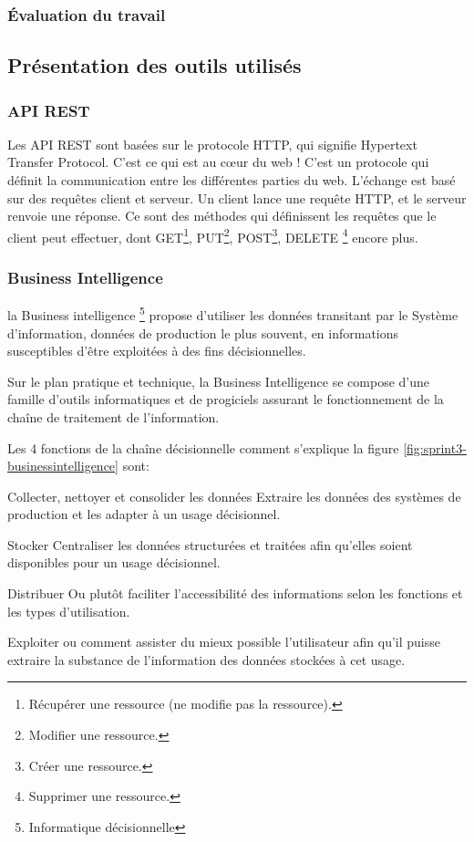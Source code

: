 \subsubsection{Évaluation du travail}
\subsection{Présentation des outils utilisés}
\subsubsection{API REST}
Les API REST sont basées sur le protocole HTTP, qui signifie Hypertext Transfer Protocol.
C’est ce qui est au cœur du web ! C’est un protocole qui définit la communication
entre les différentes parties du web. L’échange est basé sur des requêtes client et serveur.
Un client lance une requête HTTP, et le serveur renvoie une réponse.
Ce sont des méthodes qui définissent les requêtes que le client peut effectuer,
dont GET\footnote{ Récupérer une ressource (ne modifie pas la ressource).}, PUT\footnote{Modifier une ressource.},
POST\footnote{ Créer une ressource.}, DELETE \footnote{Supprimer une ressource.} encore plus. 

\subsubsection{Business Intelligence}

la Business intelligence \footnote{Informatique décisionnelle} propose d'utiliser 
les données transitant par le Système
d'information, données de production le plus souvent, en informations susceptibles 
d'être exploitées à des fins décisionnelles. 

Sur le plan pratique et technique, la Business Intelligence se compose d'une famille 
d'outils informatiques et 
de progiciels assurant le fonctionnement de la chaîne de traitement de l'information. 

Les 4 fonctions de la chaîne décisionnelle comment s'explique la figure \ref{fig:sprint3-businessintelligence} sont:
\begin{description}[align=right,labelwidth=1cm]
 \item [1] Collecter, nettoyer et consolider les données Extraire les données 
 des systèmes de production et les adapter à un usage décisionnel. 
 \item [2] Stocker Centraliser les données structurées et traitées afin qu'elles
 soient disponibles pour un usage décisionnel. 
 \item [3] Distribuer Ou plutôt faciliter l'accessibilité des informations selon 
 les fonctions et les types d'utilisation. 
 \item [4] Exploiter ou comment assister du mieux possible l'utilisateur afin qu'il puisse extraire 
 la substance de l'information des données stockées à cet usage. 
\end{description}

